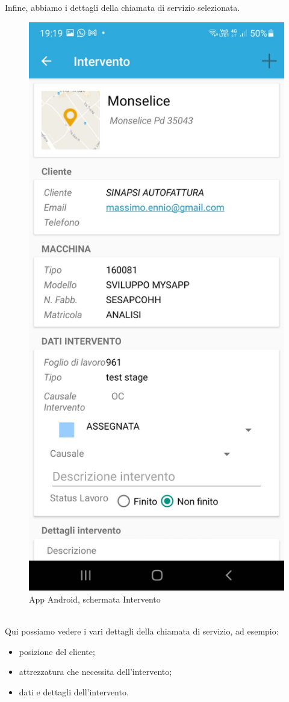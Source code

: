 \newpage
Infine, abbiamo i dettagli della chiamata di servizio selezionata.\\
\begin{figure}[!h] 
	\centering 
	\includegraphics[scale = 0.2]{immagini/app Android/intervento-android.jpeg} 
	\caption {App Android, schermata Intervento}
\end{figure}
\\Qui possiamo vedere i vari dettagli della chiamata di servizio, ad esempio:
\begin{itemize}
	\item posizione del cliente;
	\item attrezzatura che necessita dell'intervento;
	\item dati e dettagli dell'intervento.
\end{itemize}
\newpage